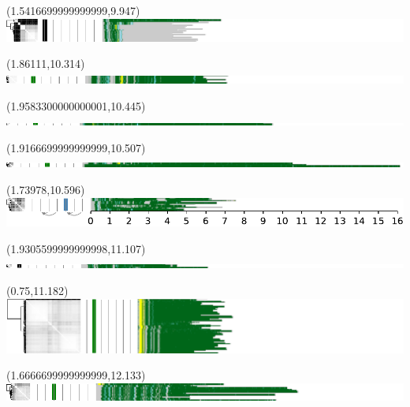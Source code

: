 \documentclass{article}
\begin{document}
\begin{textblock}{13}(1.5416699999999999,9.947)\includegraphics{./Figure_S5/chr15-HG001.pdf}\end{textblock}
\begin{textblock}{13}(1.86111,10.314)\includegraphics{./Figure_S5/chr15-HG002.pdf}\end{textblock}
\begin{textblock}{13}(1.9583300000000001,10.445)\includegraphics{./Figure_S5/chr15-HG003.pdf}\end{textblock}
\begin{textblock}{13}(1.9166699999999999,10.507)\includegraphics{./Figure_S5/chr15-HG004.pdf}\end{textblock}
\begin{textblock}{13}(1.73978,10.596)\includegraphics{./Figure_S5/chr15-HG005.pdf}\end{textblock}
\begin{textblock}{13}(1.9305599999999998,11.107)\includegraphics{./Figure_S5/18qtel_1-500K_1_12_12_rc-HG001.pdf}\end{textblock}
\begin{textblock}{13}(0.75,11.182)\includegraphics{./Figure_S5/18qtel_1-500K_1_12_12_rc-HG002.pdf}\end{textblock}
\begin{textblock}{13}(1.6666699999999999,12.133)\includegraphics{./Figure_S5/18qtel_1-500K_1_12_12_rc-HG003.pdf}\end{textblock}
\end{document}
